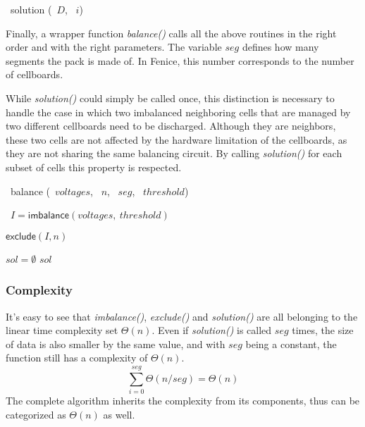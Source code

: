\begin{algorithm}[H]
    \DontPrintSemicolon
    \NoCaptionOfAlgo
    \caption[solution]{\SET\ \textsf{solution} (\INTARRAY\ $D$, \INTEGER\ $i$)}\label{algorithm:solution}
\end{algorithm}

Finally, a wrapper function \textit{balance()} calls all the above routines in the right order and with the right parameters. The variable $seg$ defines how many segments the pack is made of. In Fenice, this number corresponds to the number of cellboards.

While \textit{solution()} could simply be called once, this distinction is necessary to handle the case in which two imbalanced neighboring cells that are managed by two different cellboards need to be discharged. Although they are neighbors, these two cells are not affected by the hardware limitation of the cellboards, as they are not sharing the same balancing circuit. By calling \textit{solution()} for each subset of cells this property is respected.
\begin{algorithm}
    \DontPrintSemicolon
    \NoCaptionOfAlgo
    \caption[balancing]{\SET\ \textsf{balance} (\INTARRAY\ $voltages$, \INTEGER\ $n$, \INTEGER\ $seg$, \INTEGER\ $threshold$)}\label{algorithm:balancing}

    \INTARRAY\ $I = \textsf{imbalance}(voltages,\ threshold)$\;


    $\textsf{exclude}(I, n)$\;

    $sol=\emptyset$\;
    \Return $sol$\;
\end{algorithm}

\subsubsection{Complexity}
It's easy to see that \textit{imbalance()}, \textit{exclude()} and \textit{solution()} are all belonging to the linear time complexity set $\Theta(n)$.
Even if \textit{solution()} is called $seg$ times, the size of data is also smaller by the same value, and with $seg$ being a constant, the function still has a complexity of $\Theta(n)$.
\[
    \sum_{i=0}^{seg} \Theta(n/seg) = \Theta(n)
\]
The complete algorithm inherits the complexity from its components, thus can be categorized as $\Theta(n)$ as well.

